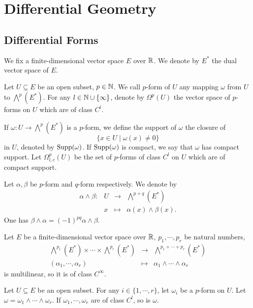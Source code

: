 \chapter{Differential Geometry}


\section{Differential Forms}


We fix a finite-dimensional vector space $E$ over $\mathbb{R}$.
We denote by $E^*$ the dual vector space of $E$.

\begin{definitionenv}
    Let $U \subseteq E$ be an open subset, $p \in \mathbb{N}$.
    We call $p$-form of $U$ any mapping $\omega$ from $U$ to $\bigwedge^p (E^*)$.
    For any $l \in \mathbb{N} \cup\{\infty\}$, denote by $\Omega^p(U)$ the vector space of $p$-forms on $U$ which are of class $C^l$.

    \quad If $\omega: U \rightarrow \bigwedge^p(E^*)$ is a $p$-form, we define the support of $\omega$ the closure of
    $$\{x \in U \mid \omega(x) \neq 0\}$$
    in $U$, denoted by $\operatorname{\mathrm{Supp}}(\omega)$.
    If $\operatorname{\mathrm{Supp}}(\omega)$ is compact, we say that $\omega$ has compact support.
    Let $\Omega_{l,c}^{p}(U)$ be the set of $p$-forms of class $C^l$ on $U$ which are of compact support.

    \quad Let $\alpha,\beta$ be $p$-form and $q$-form respectively.
    We denote by
    $$\begin{array}{rrcl}
        \alpha \wedge \beta : & U & \longrightarrow & \bigwedge^{p+q}(E^*)\\
        & x & \longmapsto & \alpha(x) \wedge \beta(x).
    \end{array}$$
    One has $\beta \wedge \alpha = (-1)^{pq} \alpha \wedge \beta$.
\end{definitionenv}

\begin{remark}
    Let $E$ be a finite-dimensional vector space over $\mathbb{R}$,
    $p_1,\cdots,p_r$ be natural numbers,
    $$\begin{array}{rcl}
        \bigwedge^{p_1} (E^*) \times \cdots \times \bigwedge^{p_r} (E^*) & \longrightarrow & \bigwedge^{p_1+\cdots+p_r} (E^*)\\
        (\alpha_1,\cdots,\alpha_r) & \longmapsto & \alpha_1 \wedge \cdots \wedge \alpha_r
    \end{array}$$
    is multilinear, so it is of class $C^{\infty}$.

    Let $U \subseteq E$ be an open subset.
    For any $i \in \{1,\cdots,r\}$, let $\omega_i$ be a $p$-form on $U$.
    Let $\omega = \omega_1 \wedge \cdots \wedge \omega_r$.
    If $\omega_1,\cdots,\omega_r$ are of class $C^l$, so is $\omega$.
\end{remark}

